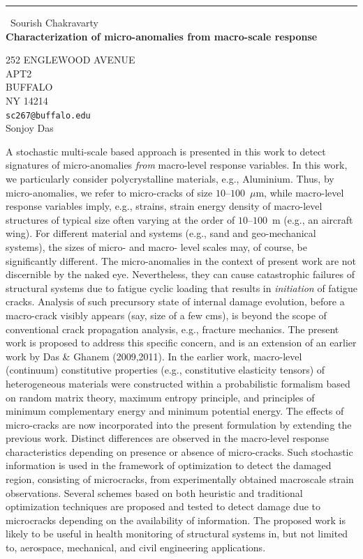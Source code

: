 \documentclass{report}
\begin{document}
\begin{center}
\rule{6in}{1pt} \
{\large Sourish Chakravarty \\
{\bf Characterization of micro-anomalies from macro-scale response}}

252 ENGLEWOOD AVENUE \\ APT2 \\ BUFFALO \\ NY 14214
\\
{\tt sc267@buffalo.edu}\\
Sonjoy Das\end{center}

A stochastic multi-scale based approach is presented in this work to
detect signatures of micro-anomalies \textit{from} macro-level response
variables. In this work, we particularly consider polycrystalline
materials, e.g., Aluminium. Thus, by micro-anomalies, we refer to
micro-cracks of size $10$--$100$~$\mu\mathrm{m}$, while macro-level
response variables imply, e.g., strains, strain energy density of
macro-level structures of typical size often varying at the order of
$10$--$100$~m (e.g., an aircraft wing). For different material and
systems (e.g., sand and geo-mechanical systems), the sizes of micro- and
macro- level scales may, of course, be significantly different. The
micro-anomalies in the context of present work are not discernible by the
naked eye. Nevertheless, they can cause catastrophic failures of
structural systems due to fatigue cyclic loading that results in
\textit{initiation} of fatigue cracks. Analysis of such precursory state
of internal damage evolution, before a macro-crack visibly appears (say,
size of a few cms), is beyond the scope of conventional crack propagation
analysis, e.g., fracture mechanics. The present work is proposed to
address this specific concern, and is an extension of an earlier work by
Das \& Ghanem (2009,2011). In the earlier work, macro-level (continuum)
constitutive properties (e.g., constitutive elasticity tensors) of
heterogeneous materials were constructed within a probabilistic formalism
based on random matrix theory, maximum entropy principle, and principles
of minimum complementary energy and minimum potential energy. The effects
of micro-cracks are now incorporated into the present formulation by
extending the previous work. Distinct differences are observed in the
macro-level response characteristics depending on presence or absence of
micro-cracks. Such stochastic information is used in the framework of
optimization to detect the damaged region, consisting of microcracks,
from experimentally obtained macroscale strain observations. Several
schemes based on both heuristic and traditional optimization techniques
are proposed and tested to detect damage due to microcracks depending on
the availability of information. The proposed work is likely to be useful
in health monitoring of structural systems in, but not limited to,
aerospace, mechanical, and civil engineering applications.
\end{document}
